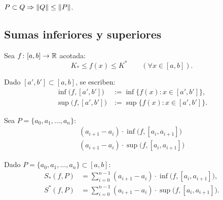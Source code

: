 \documentclass[11pt,a4paper]{article}
\begin{document}
\begin{observacion}
$P\subset Q \Rightarrow \lVert Q\rVert\le\lVert P\rVert$.
\end{observacion}

\subsection{Sumas inferiores y superiores}

Sea $f\colon[a,b]\to\mathbb{R}$ acotada:
\[
  K_*\le f(x)\le K^* \qquad (\forall x\in[a,b]).
\]

\begin{notacion}
Dado $[a',b']\subset[a,b]$, se escriben:
\begin{align*}
  \inf\bigl(f,[a',b']\bigr) &:= \inf\{f(x) : x\in[a',b']\},\\
  \sup\bigl(f,[a',b']\bigr) &:= \sup\{f(x) : x\in[a',b']\}.
\end{align*}
\end{notacion}

\begin{minipage}{0.58\textwidth}
Sea $P=\{a_0,a_1,\dots,a_n\}$:
\begin{gather*}
  (a_{i+1}-a_i)\cdot\inf\bigl(f,[a_i,a_{i+1}]\bigr)\\
  (a_{i+1}-a_i)\cdot\sup\bigl(f,[a_i,a_{i+1}]\bigr)
\end{gather*}
\end{minipage}\hfill
\begin{minipage}{0.38\textwidth}
\centering
{}
\end{minipage}

\begin{definicion}
Dado $P=\{a_0,a_1,\dots,a_n\}\subset[a,b]$:
\begin{align*}
  S_*(f,P) &= \sum_{i=0}^{n-1}(a_{i+1}-a_i)\cdot\inf\bigl(f,[a_i,a_{i+1}]\bigr),\\
  S^*(f,P) &= \sum_{i=0}^{n-1}(a_{i+1}-a_i)\cdot\sup\bigl(f,[a_i,a_{i+1}]\bigr).
\end{align*}
\end{definicion}
\end{document}
